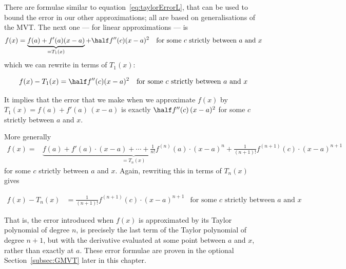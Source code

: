 \begin{eg}
\end{eg}

There are formulae similar to equation~\eqref{eq:taylorErrorL}, that can be used to bound
the error in our other approximations; all are based on generalisations of the
MVT. The
next one --- for linear approximations --- is
\begin{align*}
f(x) & =\underbrace{f(a)+f'(a)(x-a)}_{=T_1(x)}+\half f''(c)(x-a)^2 &
\text{for some $c$ strictly between $a$ and $x$}
\end{align*}
which we can rewrite in terms of $T_1(x)$:
\begin{impeqn}\label{eq:taylorErrorQ}
\begin{align*}
f(x)-T_1(x) &=  \half f''(c)(x-a)^2 & \text{for some $c$ strictly between $a$ and $x$}
\end{align*}
\end{impeqn}
It implies that the error that we make when we approximate $f(x)$ by
$T_1(x) = f(a)+f'(a)\,(x-a)$ is exactly $\half f''(c)\,(x-a)^2$ for some $c$ strictly
between $a$ and $x$.


More generally
\begin{align*}
f(x)=&
\underbrace{f(a)+f'(a)\cdot(x-a)+\cdots+\frac{1}{n!}f^{(n)}(a)\cdot(x-a)^n}_{= T_n(x)}
+\frac{1}{(n+1)!}f^{(n+1)}(c)\cdot (x-a)^{n+1}
\end{align*}
for some $c$ strictly between $a$ and $x$. Again, rewriting this in terms of $T_n(x)$
gives
\begin{impeqn}\label{eq:taylorErrorN}
\begin{align*}
  f(x) - T_n(x) &= \frac{1}{(n+1)!}f^{(n+1)}(c)\cdot (x-a)^{n+1}
& \text{for some $c$ strictly between $a$ and $x$}
\end{align*}
\end{impeqn}

That is, the error introduced when $f(x)$ is approximated by its Taylor
polynomial of degree $n$, is precisely the last term of the Taylor polynomial
of degree $n+1$, but with the derivative evaluated at some point between
$a$ and $x$, rather than exactly at $a$. These error formulae are proven
in the optional Section~\ref{subsec:GMVT} later in this chapter.


